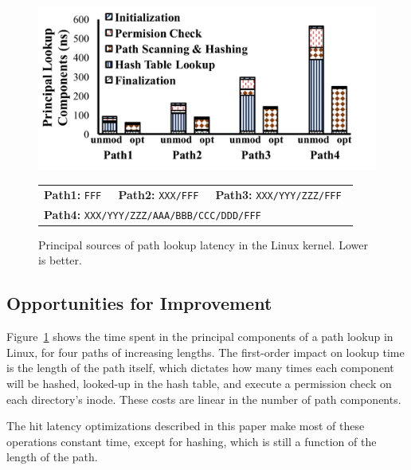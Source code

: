 \begin{figure}
\centering
\includegraphics[width=0.95\linewidth]{dcache/plots/lookup-breakdown.pdf} \\
\vspace{5pt}
\footnotesize
\begin{tabular}{lll}
{\bf Path1:} \tt FFF &
{\bf Path2:} \tt XXX/FFF &
{\bf Path3:} \tt XXX/YYY/ZZZ/FFF \\
\multicolumn{3}{l}{{\bf Path4:} \tt XXX/YYY/ZZZ/AAA/BBB/CCC/DDD/FFF} \\
\end{tabular}
\caption{Principal sources of path lookup latency in the Linux \linuxver{} kernel. Lower is better.
}
\label{fig:breakdown}
\end{figure}


\subsection{Opportunities for Improvement}

Figure~\ref{fig:breakdown} shows the time spent in the principal components
of a path lookup in Linux, for four paths of increasing lengths.
The first-order impact on lookup time is the length of the path itself,
which dictates how many times each component will be hashed, looked-up in the 
hash table, and execute a permission check on each directory's inode.
These costs are linear in the number of path components.


The hit latency optimizations described in this paper make most of these 
operations constant time, except for hashing, which is still a function of the 
length of the path.  


